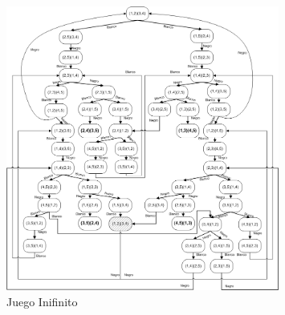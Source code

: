         \begin{figure}[p!hbt]
		\centering
		\includegraphics[angle=0, width=0.8\textwidth]{../img/GrafoPongInfinito.png}
		\caption{Juego Inifinito}
		\label{fig:Juego_Infinito}
	\end{figure}











